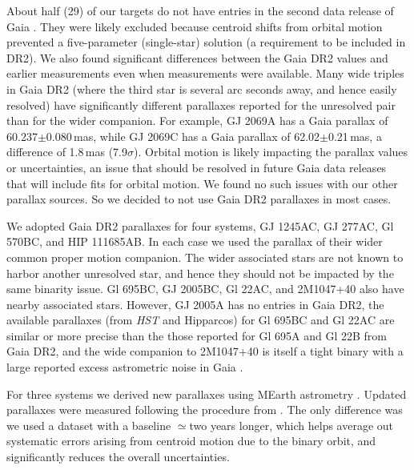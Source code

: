 \documentclass[twocolumn]{aastex62}
\begin{document}
About half (29) of our targets do not have entries in the second data release of Gaia \citep[DR2, ][]{GaiaDr2,Gaia-Collaboration:2018aa}. They were likely excluded because centroid shifts from orbital motion prevented a five-parameter (single-star) solution (a requirement to be included in DR2). We also found significant differences between the Gaia DR2 values and earlier measurements \citep[including from TGAS, ][]{2015A&A...574A.115M,gaiadr1} even when measurements were available. Many wide triples in Gaia DR2 (where the third star is several arc seconds away, and hence easily resolved) have significantly different parallaxes reported for the unresolved pair than for the wider companion. For example, GJ 2069A has a Gaia parallax of 60.237$\pm$0.080\,mas, while GJ 2069C has a Gaia parallax of 62.02$\pm$0.21\,mas, a difference of 1.8\,mas (7.9$\sigma$). Orbital motion is likely impacting the parallax values or uncertainties, an issue that should be resolved in future Gaia data releases that will include fits for orbital motion. We found no such issues with our other parallax sources. So we decided to not use Gaia DR2 parallaxes in most cases. 

We adopted Gaia DR2 parallaxes for four systems, GJ 1245AC, GJ 277AC, Gl 570BC, and HIP 111685AB. In each case we used the parallax of their wider common proper motion companion. The wider associated stars are not known to harbor another unresolved star, and hence they should not be impacted by the same binarity issue. Gl 695BC, GJ 2005BC, Gl 22AC, and 2M1047+40 also have nearby associated stars. %
However, GJ 2005A has no entries in Gaia DR2, the available parallaxes (from {\it HST} and Hipparcos) for Gl 695BC and Gl 22AC are similar or more precise than the those reported for Gl 695A and Gl 22B from Gaia DR2, and the wide companion to 2M1047+40 is itself a tight binary \citep[LP 213-67AB,][]{Dupuy2017} with a large reported excess astrometric noise in Gaia \citep[a sign of binarity, ][]{2018RNAAS...2...20E}.

For three systems we derived new parallaxes using MEarth astrometry \citep{Nutzman:2008gf}. Updated parallaxes were measured following the procedure from \citet{2014ApJ...784..156D}. The only difference was we used a dataset with a baseline $\simeq$two years longer, which helps average out systematic errors arising from centroid motion due to the binary orbit, and significantly reduces the overall uncertainties. 
\end{document}
